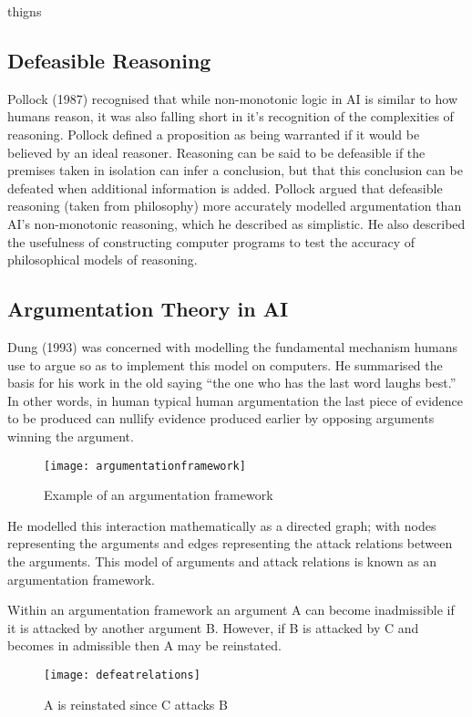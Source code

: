 thigns
\subsection{Defeasible Reasoning}

Pollock (1987) recognised that while non-monotonic logic in AI is similar to how humans reason, it was also falling short in it’s recognition of the complexities of reasoning. Pollock defined a proposition as being warranted if it would be believed by an ideal reasoner. Reasoning can be said to be defeasible if the premises taken in isolation can infer a conclusion, but that this conclusion can be defeated when additional information is added. Pollock argued that defeasible reasoning (taken from philosophy) more accurately modelled argumentation than AI's non-monotonic reasoning, which he described as simplistic. He also described the usefulness of constructing computer programs to test the accuracy of philosophical models of reasoning.


\subsection{Argumentation Theory in AI}

Dung (1993) was concerned with modelling the fundamental mechanism humans use to argue so as to implement this model on computers. He summarised the basis for his work in the old saying “the one who has the last word laughs best.” In other words, in human typical human argumentation the last piece of evidence to be produced can nullify evidence produced earlier by opposing arguments winning the argument.

\begin{figure}[h]
\caption{Example of an argumentation framework}
\centering
\texttt{[image: argumentationframework]}
\end{figure}

He modelled this interaction mathematically as a directed graph; with nodes representing the arguments and edges representing the attack relations between the arguments. This model of arguments and attack relations is known as an argumentation framework.

Within an argumentation framework an argument A can become inadmissible if it is attacked by another argument B. However, if B is attacked by C and becomes in admissible then A may be reinstated.

\begin{figure}[h]
\caption{A is reinstated since C attacks B}
\centering
\texttt{[image: defeatrelations]}
\end{figure}

